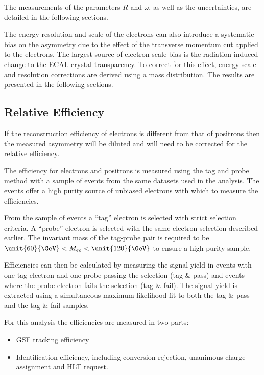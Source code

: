 The measurements of the parameters $R$ and $\omega$, as well as the
uncertainties, are detailed in the following sections.

The energy resolution and scale of the electrons can also introduce a systematic
bias on the asymmetry due to the effect of the transverse momentum cut
applied to the electrons. The largest source of electron scale bias is the
radiation-induced change to the ECAL crystal transparency.
To correct for this effect, energy scale and resolution corrections are
derived using a \Zee mass distribution. The results are presented in the
following sections.

\subsection{Relative Efficiency}

If the reconstruction efficiency of electrons is different from that of
positrons then the measured asymmetry will be diluted and will need to be
corrected for the relative efficiency.

The efficiency for electrons and positrons is measured using the tag and probe
method \cite{tagandprobe}
with a sample of \Zee events from the same datasets used in the analysis. 
The \Zee events offer a high purity source of unbiased electrons with which to
measure the efficiencies.

From the sample of \Zee events a ``tag'' electron is selected with strict
selection criteria. 
A ``probe'' electron is selected with the same electron selection described
earlier.
The invariant mass of the tag-probe pair is required to be
$\unit{60}{\GeV} < M_{ee} < \unit{120}{\GeV}$ to ensure a high purity sample.

Efficiencies can then be calculated by measuring the signal yield in events
with one tag electron and one probe passing the selection (tag \& pass) and
events where the probe electron fails the selection (tag \& fail).
The signal yield is extracted using a simultaneous maximum likelihood fit to
both the tag \& pass and the tag \& fail samples.

For this analysis the efficiencies are measured in two parts:

\begin{itemize}
    \item GSF tracking efficiency
    \item Identification efficiency, including conversion rejection, unanimous
charge assignment and HLT request.
\end{itemize}

